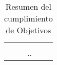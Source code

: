 \begin{table}[!ht]
{\begin{minipage}{\textwidth}
\begin{tabular}{|p{10cm}|p{10cm}|}
{             \textbf{Análisis}: Apartado \ref{parte:analisis}\\
            }
            & ..\\ \hline

            \end{tabular}
        \end{minipage}%
    }
    \caption{Resumen del cumplimiento de Objetivos}
    \label{tabla:cumplimientoObjetivo1}
\end{table}


%
%
%
%
%
%





%




